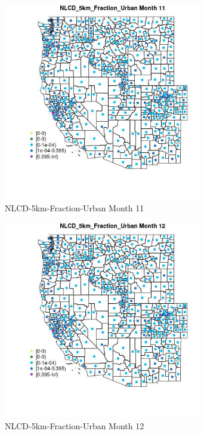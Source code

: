 \begin{figure} 
\centering  
\includegraphics[width=0.77\textwidth]{Code_Outputs/df_report_ML_predictors_CountyCentroid_Locations_Dates_2008-01-01to2018-12-31_MapObsMo11NLCD_5km_Fraction_Urban.jpg} 
\caption{\label{fig:df_report_ML_predictors_CountyCentroid_Locations_Dates_2008-01-01to2018-12-31MapObsMo11NLCD_5km_Fraction_Urban}NLCD-5km-Fraction-Urban Month 11} 
\end{figure} 
 

\clearpage 

\begin{figure} 
\centering  
\includegraphics[width=0.77\textwidth]{Code_Outputs/df_report_ML_predictors_CountyCentroid_Locations_Dates_2008-01-01to2018-12-31_MapObsMo12NLCD_5km_Fraction_Urban.jpg} 
\caption{\label{fig:df_report_ML_predictors_CountyCentroid_Locations_Dates_2008-01-01to2018-12-31MapObsMo12NLCD_5km_Fraction_Urban}NLCD-5km-Fraction-Urban Month 12} 
\end{figure} 
 


